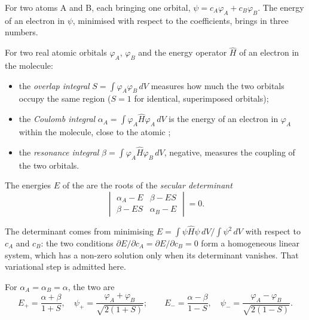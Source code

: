 For two atoms A and B, each bringing one orbital, $\psi = c_A\varphi_A + c_B\varphi_B$.
The energy of an electron in $\psi$, minimised with respect to the coefficients,
brings in three numbers.

\begin{definition}\label{def:b2:diatomic-mos:integrals}
For two real atomic orbitals $\varphi_A$, $\varphi_B$ and the energy operator $\hat H$
of an electron in the molecule:
\begin{itemize}
  \item the \emph{overlap integral} $S = \int\varphi_A\varphi_B\,dV$
        measures how much the two orbitals occupy the same region ($S = 1$ for
        identical, superimposed orbitals);
  \item the \emph{Coulomb integral} $\alpha_A = \int\varphi_A\hat
        H\varphi_A\,dV$ is the energy of an electron in $\varphi_A$ within the molecule,
        close to the atomic ;
  \item the \emph{resonance integral} $\beta = \int\varphi_A\hat
        H\varphi_B\,dV$, negative, measures the coupling of the two orbitals.
\end{itemize}
The energies $E$ of the  are the roots of the \emph{secular
determinant}
\[
  \begin{vmatrix} \alpha_A - E & \beta - ES \\ \beta - ES & \alpha_B - E \end{vmatrix} = 0 .
\]
\end{definition}

The determinant comes from minimising $E = \int\psi\hat H\psi\,dV/\int\psi^2\,dV$
with respect to $c_A$ and $c_B$: the two conditions $\partial E/\partial c_A =
\partial E/\partial c_B = 0$ form a homogeneous linear system, which has a non-zero
solution only when its determinant vanishes. That variational step is admitted
here.

\begin{theorem}\label{thm:b2:diatomic-mos:homonuclear}
For $\alpha_A = \alpha_B = \alpha$, the two  are
\[
  E_+ = \frac{\alpha + \beta}{1 + S}, \quad \psi_+ = \frac{\varphi_A + \varphi_B}{\sqrt{2(1 + S)}} ;
  \qquad
  E_- = \frac{\alpha - \beta}{1 - S}, \quad \psi_- = \frac{\varphi_A - \varphi_B}{\sqrt{2(1 - S)}} .
\]
\end{theorem}

